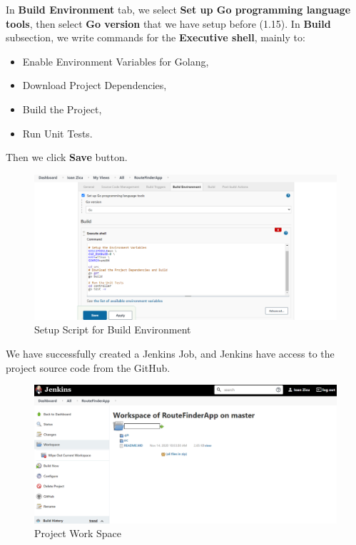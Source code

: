\documentclass[12pt,a4paper,twoside]{article}
\begin{document}
In \textbf{Build Environment} tab, we select \textbf{Set up Go programming language tools}, then select \textbf{Go version} that we have setup before (1.15).
In \textbf{Build} subsection, we write commands for the \textbf{Executive shell}, mainly to:


\begin{itemize}
	\item Enable Environment Variables for Golang, 
	\item Download Project Dependencies,
	\item Build the Project,
	\item Run Unit Tests.
\end{itemize}


Then we click \textbf{Save} button.


\begin{figure}[H]
    \centering
        \includegraphics[width=15cm]{images-aws/36-project-build-env-golang-.png}
        \caption{Setup Script for Build Environment}
\end{figure}


We have successfully created a Jenkins Job, and Jenkins have access to the project source code from the GitHub.


\begin{figure}[H]
    \centering
        \includegraphics[width=15cm]{images-aws/37-project-workspace-git.png}
        \caption{Project Work Space}
\end{figure}
\end{document}
